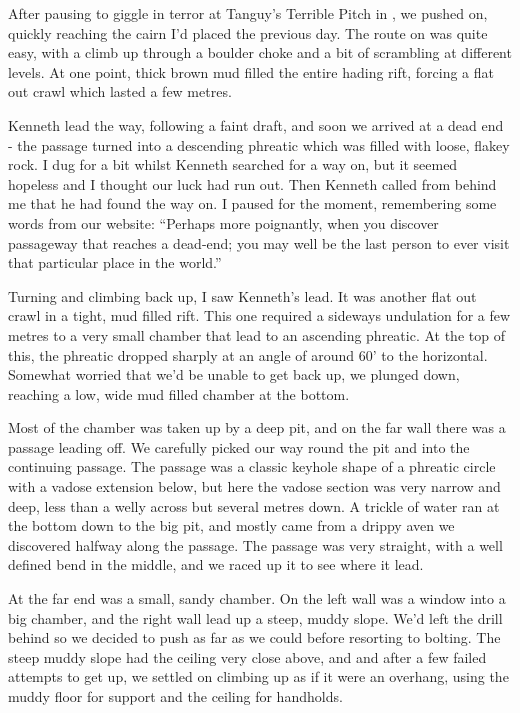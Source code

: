After pausing to giggle in terror at Tanguy’s Terrible Pitch in , we pushed on, quickly reaching the cairn I’d placed the previous day. The route on was quite easy, with a climb up through a boulder choke and a bit of scrambling at different levels. At one point, thick brown mud filled the entire hading rift, forcing a flat out crawl which lasted a few metres.
 
Kenneth lead the way, following a faint draft, and soon we arrived at a dead end - the passage turned into a descending phreatic which was filled with loose, flakey rock. I dug for a bit whilst Kenneth searched for a way on, but it seemed hopeless and I thought our luck had run out. Then Kenneth called from behind me that he had found the way on. I paused for the moment, remembering some words from our website: “Perhaps more poignantly, when you discover passageway that reaches a dead-end; you may well be the last person to ever visit that particular place in the world.”
 
Turning and climbing back up, I saw Kenneth’s lead. It was another flat out crawl in a tight, mud filled rift. This one required a sideways undulation for a few metres to a very small chamber that lead to an ascending phreatic. At the top of this, the phreatic dropped sharply at an angle of around 60’ to the horizontal. Somewhat worried that we’d be unable to get back up, we plunged down, reaching a low, wide mud filled chamber at the bottom.
 
Most of the chamber was taken up by a deep pit, and on the far wall there was a passage leading off. We carefully picked our way round the pit and into the continuing passage. The passage was a classic keyhole shape of a phreatic circle with a vadose extension below, but here the vadose section was very narrow and deep, less than a welly across but several metres down. A trickle of water ran at the bottom down to the big pit, and mostly came from a drippy aven we discovered halfway along the passage. The passage was very straight, with a well defined bend in the middle, and we raced up it to see where it lead.
 
At the far end was a small, sandy chamber. On the left wall was a window into a big chamber, and the right wall lead up a steep, muddy slope. We’d left the drill behind so we decided to push as far as we could before resorting to bolting. The steep muddy slope had the ceiling very close above, and and after a few failed attempts to get up, we settled on climbing up as if it were an overhang, using the muddy floor for support and the ceiling for handholds.
 
